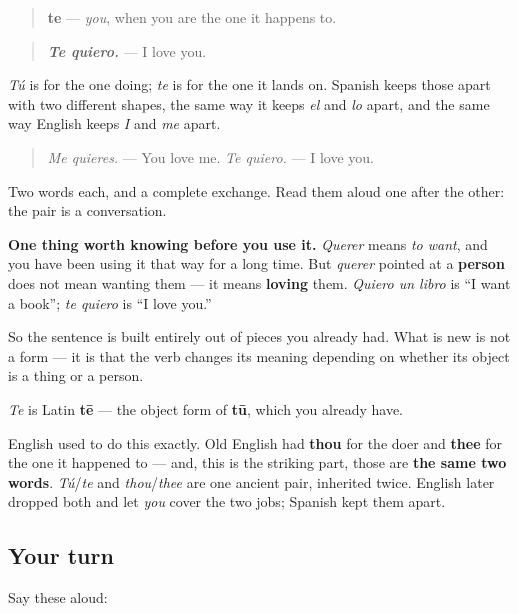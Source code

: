 \begin{grammarlens}[title={Grammar Lens: the partner of tú}]
\begin{quote}
\textbf{te} — \emph{you}, when you are the one it happens to.
\end{quote}

\begin{quote}
\emph{\textbf{Te quiero.}} — I love you.
\end{quote}

\emph{Tú} is for the one doing; \emph{te} is for the one it lands on. Spanish keeps those apart with two different shapes, the same way it keeps \emph{el} and \emph{lo} apart, and the same way English keeps \emph{I} and \emph{me} apart.

\begin{quote}
\emph{Me quieres.} — You love me. \emph{Te quiero.} — I love you.
\end{quote}

Two words each, and a complete exchange. Read them aloud one after the other: the pair is a conversation.

\textbf{One thing worth knowing before you use it.} \emph{Querer} means \emph{to want}, and you have been using it that way for a long time. But \emph{querer} pointed at a \textbf{person} does not mean wanting them — it means \textbf{loving} them. \emph{Quiero un libro} is \textquotedblleft{}I want a book\textquotedblright{}; \emph{te quiero} is \textquotedblleft{}I love you.\textquotedblright{}

So the sentence is built entirely out of pieces you already had. What is new is not a form — it is that the verb changes its meaning depending on whether its object is a thing or a person.
\end{grammarlens}

\begin{cousinweb}
\emph{Te} is Latin \textbf{tē} — the object form of \textbf{tū}, which you already have.

English used to do this exactly. Old English had \textbf{thou} for the doer and \textbf{thee} for the one it happened to — and, this is the striking part, those are \textbf{the same two words}. \emph{Tú}/\emph{te} and \emph{thou}/\emph{thee} are one ancient pair, inherited twice. English later dropped both and let \emph{you} cover the two jobs; Spanish kept them apart.
\end{cousinweb}

\subsection*{Your turn}
Say these aloud:

